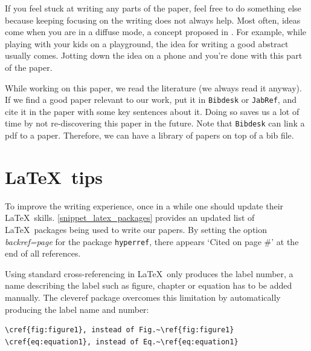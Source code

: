 \documentclass[authoryear,3p,times,preprint,review,fleqn]{elsarticle}
\numberwithin{equation}{section}
\theoremstyle{remark}
\begin{document}


If you feel stuck at writing any parts of the paper, feel free to do something else because keeping focusing on the writing does not always help. Most often, ideas come when you are in a diffuse mode, a concept proposed in \cite{Oakley:2018a}. For example, while playing with your kids on a playground, the idea for writing a good abstract usually comes. Jotting down the idea on a phone and you're done with this part of the paper.

While working on this paper, we read the literature (we always read it anyway). If we find a good paper relevant to our work, put it in \texttt{Bibdesk} or \texttt{JabRef}, and cite it in the paper with some key sentences about it. Doing so saves us a lot of time by not re-discovering this paper in the future. Note that \texttt{Bibdesk} can link a pdf to a paper. Therefore, we can have a library of papers on top of a bib file. 



\section{\LaTeX\ tips}\label{sec:latex}

To improve the writing experience, once in a while one should update their \LaTeX\ skills. \cref{snippet_latex_packages} provides an updated list of \LaTeX\ packages being used to write our papers.
By setting the option \textit{backref=page} for the package \texttt{hyperref}, there appears `Cited on page \#' at the end of all references. 

Using standard cross-referencing in \LaTeX\ only produces the label number, a name describing the label such as figure, chapter or equation has to be added manually. The cleveref package overcomes this limitation by automatically producing the label name and number:

\begin{verbatim}
\cref{fig:figure1}, instead of Fig.~\ref{fig:figure1}
\cref{eq:equation1}, instead of Eq.~\ref{eq:equation1}
\end{verbatim}
\end{document}

